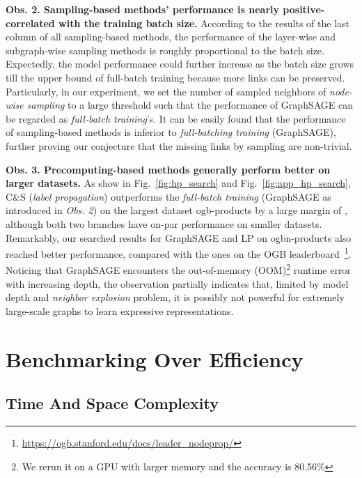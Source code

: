 \message{ !name(main.tex)}\documentclass{article}
\begin{document}
\textbf{Obs. 2. Sampling-based methods' performance is nearly positive-correlated with the training batch size.} According to the results of the last column of all sampling-based methods, the performance of the layer-wise and subgraph-wise sampling methods is roughly proportional to the batch size. Expectedly, the model performance could further increase as the batch size grows till the upper bound of full-batch training because more links can be preserved. Particularly, in our experiment, we set the number of sampled neighbors of \textit{node-wise sampling} to a large threshold such that the performance of GraphSAGE can be regarded as \textit{full-batch training}'s. It can be easily found that the performance of sampling-based methods is inferior to \textit{full-batching training} (GraphSAGE), further proving our conjecture that the missing links by sampling are non-trivial.

\textbf{Obs. 3. Precomputing-based methods generally perform better on larger datasets.} As show in Fig.~\ref{fig:hp_search} and Fig.~\ref{fig:app_hp_search}, C\&S (\textit{label propagation}) outperforms the \textit{full-batch training} (GraphSAGE as introduced in \textit{Obs. 2}) on the largest dataset ogb-products by a large margin of , although both two branches have on-par performance on smaller datasets. Remarkably, our searched results for GraphSAGE and LP on ogbn-products also reached better performance, compared with the ones on the OGB leaderboard~\footnote{\url{https://ogb.stanford.edu/docs/leader_nodeprop/}}. Noticing that GraphSAGE encounters the out-of-memory (OOM)\footnote{We rerun it on a GPU with larger memory and the accuracy is 80.56\%} runtime error with increasing depth, the observation partially indicates that, limited by model depth and \textit{neighbor explosion} problem, it is possibly not powerful for extremely large-scale graphs to learn expressive representations.

\vspace{-2mm}
\section{Benchmarking Over Efficiency}\label{sec:benchmarking_efficiency}
\vspace{-2mm}
\subsection{Time And Space Complexity}
\end{document}
